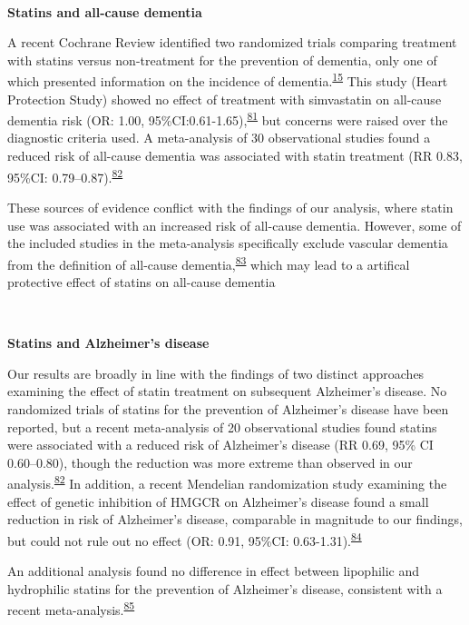 \documentclass[a4paper, twoside]{templates/ociamthesis}
\begin{document}
~

\textbf{Statins and all-cause dementia}

A recent Cochrane Review identified two randomized trials comparing treatment with statins versus non-treatment for the prevention of dementia, only one of which presented information on the incidence of dementia.\textsuperscript{\protect\hyperlink{ref-mcguinness2016a}{15}} This study (Heart Protection Study) showed no effect of treatment with simvastatin on all-cause dementia risk (OR: 1.00, 95\%CI:0.61-1.65),\textsuperscript{\protect\hyperlink{ref-heartprotectionstudycollaborativegroup2002}{81}} but concerns were raised over the diagnostic criteria used. A meta-analysis of 30 observational studies found a reduced risk of all-cause dementia was associated with statin treatment (RR 0.83, 95\%CI: 0.79--0.87).\textsuperscript{\protect\hyperlink{ref-poly2020}{82}}

These sources of evidence conflict with the findings of our analysis, where statin use was associated with an increased risk of all-cause dementia. However, some of the included studies in the meta-analysis specifically exclude vascular dementia from the definition of all-cause dementia,\textsuperscript{\protect\hyperlink{ref-chao2015}{83}} which may lead to a artifical protective effect of statins on all-cause dementia

~

\textbf{Statins and Alzheimer's disease}

Our results are broadly in line with the findings of two distinct approaches examining the effect of statin treatment on subsequent Alzheimer's disease. No randomized trials of statins for the prevention of Alzheimer's disease have been reported, but a recent meta-analysis of 20 observational studies found statins were associated with a reduced risk of Alzheimer's disease (RR 0.69, 95\% CI 0.60--0.80), though the reduction was more extreme than observed in our analysis.\textsuperscript{\protect\hyperlink{ref-poly2020}{82}} In addition, a recent Mendelian randomization study examining the effect of genetic inhibition of HMGCR on Alzheimer's disease found a small reduction in risk of Alzheimer's disease, comparable in magnitude to our findings, but could not rule out no effect (OR: 0.91, 95\%CI: 0.63-1.31).\textsuperscript{\protect\hyperlink{ref-williams}{84}}

An additional analysis found no difference in effect between lipophilic and hydrophilic statins for the prevention of Alzheimer's disease, consistent with a recent meta-analysis.\textsuperscript{\protect\hyperlink{ref-chu2018}{85}}
\end{document}
